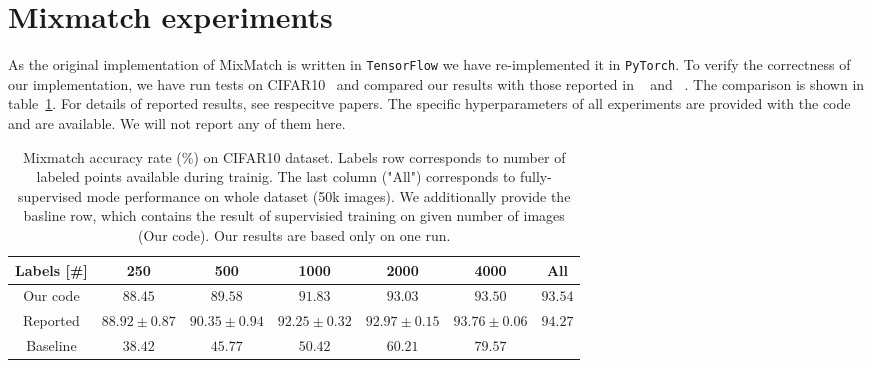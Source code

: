 \section{Mixmatch experiments}
As the original implementation of MixMatch is written in \texttt{TensorFlow} we have re-implemented it in \texttt{PyTorch}. To verify the correctness
 of our implementation, we have run tests on CIFAR10~\cite{cifar10-2009} and compared our results with those reported in ~\cite{mixmatch-2019} and ~\cite{wide-resnet-2017}. The 
comparison is shown in table~\ref{tab:mixmatch-cifar10}. For details of reported results, see respecitve papers. 
The specific hyperparameters of all experiments are provided with the code and are available. We will not report any of them here.
 
\begin{table}[tbh]
    \begin{tabular}{|c|c|c|c|c|c|c|}
    \hline
    Labels [\#]  & 250 & 500 & 1000 & 2000 & 4000 & All \\
    \hline
    Our code & $88.45$ & $89.58$& $91.83$ & $93.03$ & $93.50$ & $93.54$\\
    \hline
    Reported & $88.92\pm0.87$ & $90.35\pm0.94$ & $92.25\pm0.32$ & $92.97\pm0.15$ & $93.76\pm 0.06$ & $94.27$\\
    \hline 
    Baseline & $38.42$ & $45.77$ & $50.42$ & $60.21$ & $79.57$ &  \\
    \hline
    \end{tabular}
    \caption[Mixmatch accuracy on CIFAR10]{Mixmatch accuracy rate (\%) on CIFAR10 dataset. Labels row corresponds to number of labeled points available during trainig. 
    The last column ("All") corresponds to fully-supervised mode performance on whole dataset (50k images).
    We additionally provide the basline row, which contains the result of supervisied training on given number of images (Our code).
    Our results are based only on one run.}
    \label{tab:mixmatch-cifar10}
\end{table}

